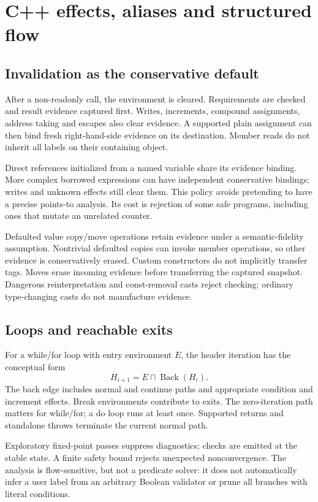 \documentclass[11pt]{article}
\begin{document}
\section{C++ effects, aliases and structured flow}
\subsection{Invalidation as the conservative default}
After a non-readonly call, the environment is cleared. Requirements are
checked and result evidence captured first. Writes, increments, compound
assignments, address taking and escapes also clear evidence. A supported
plain assignment can then bind fresh right-hand-side evidence on its
destination. Member reads do not inherit all labels on their containing object.

Direct references initialized from a named variable share its evidence
binding. More complex borrowed expressions can have independent conservative
bindings; writes and unknown effects still clear them. This policy avoids
pretending to have a precise points-to analysis. Its cost is rejection of
some safe programs, including ones that mutate an unrelated counter.

Defaulted value copy/move operations retain evidence under a semantic-fidelity
assumption. Nontrivial defaulted copies can invoke member operations, so other
evidence is conservatively erased. Custom constructors do not implicitly
transfer tags. Moves erase incoming evidence before transferring the captured
snapshot. Dangerous reinterpretation and const-removal casts reject checking;
ordinary type-changing casts do not manufacture evidence.

\subsection{Loops and reachable exits}
For a while/for loop with entry environment $E$, the header iteration has
the conceptual form
\[
 H_{i+1}=E\sqcap\operatorname{Back}(H_i).
\]
The back edge includes normal and continue paths and appropriate condition
and increment effects. Break environments contribute to exits. The zero-iteration
path matters for while/for; a do loop runs at least once. Supported returns
and standalone throws terminate the current normal path.

Exploratory fixed-point passes suppress diagnostics; checks are emitted at
the stable state. A finite safety bound rejects unexpected nonconvergence.
The analysis is flow-sensitive, but not a predicate solver: it does not
automatically infer a user label from an arbitrary Boolean validator or
prune all branches with literal conditions.
\end{document}
